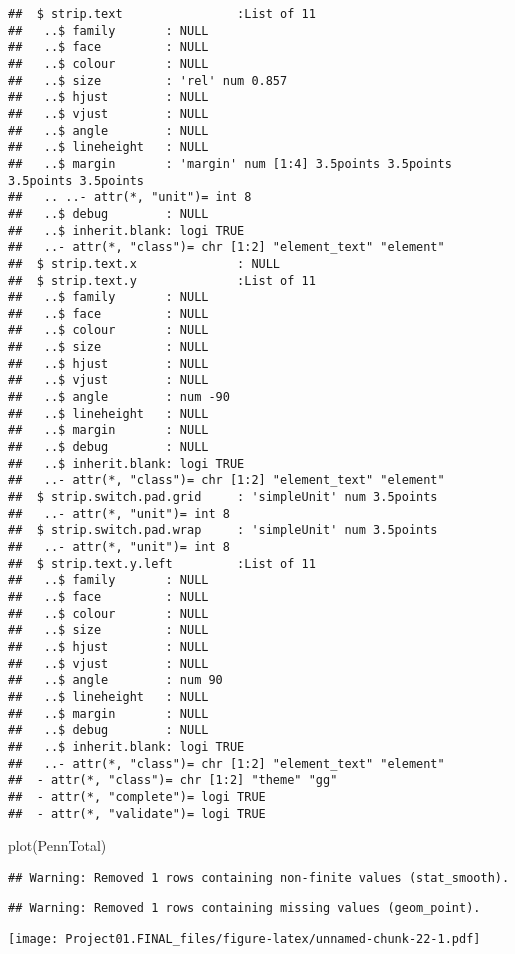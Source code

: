 \documentclass[
]{article}
\newenvironment{Shaded}{\begin{snugshade}}{\end{snugshade}}
\newcommand{\FunctionTok}[1]{\textcolor[rgb]{0.00,0.00,0.00}{#1}}
\newcommand{\NormalTok}[1]{#1}
\begin{document}
\begin{verbatim}
##  $ strip.text                :List of 11
##   ..$ family       : NULL
##   ..$ face         : NULL
##   ..$ colour       : NULL
##   ..$ size         : 'rel' num 0.857
##   ..$ hjust        : NULL
##   ..$ vjust        : NULL
##   ..$ angle        : NULL
##   ..$ lineheight   : NULL
##   ..$ margin       : 'margin' num [1:4] 3.5points 3.5points 3.5points 3.5points
##   .. ..- attr(*, "unit")= int 8
##   ..$ debug        : NULL
##   ..$ inherit.blank: logi TRUE
##   ..- attr(*, "class")= chr [1:2] "element_text" "element"
##  $ strip.text.x              : NULL
##  $ strip.text.y              :List of 11
##   ..$ family       : NULL
##   ..$ face         : NULL
##   ..$ colour       : NULL
##   ..$ size         : NULL
##   ..$ hjust        : NULL
##   ..$ vjust        : NULL
##   ..$ angle        : num -90
##   ..$ lineheight   : NULL
##   ..$ margin       : NULL
##   ..$ debug        : NULL
##   ..$ inherit.blank: logi TRUE
##   ..- attr(*, "class")= chr [1:2] "element_text" "element"
##  $ strip.switch.pad.grid     : 'simpleUnit' num 3.5points
##   ..- attr(*, "unit")= int 8
##  $ strip.switch.pad.wrap     : 'simpleUnit' num 3.5points
##   ..- attr(*, "unit")= int 8
##  $ strip.text.y.left         :List of 11
##   ..$ family       : NULL
##   ..$ face         : NULL
##   ..$ colour       : NULL
##   ..$ size         : NULL
##   ..$ hjust        : NULL
##   ..$ vjust        : NULL
##   ..$ angle        : num 90
##   ..$ lineheight   : NULL
##   ..$ margin       : NULL
##   ..$ debug        : NULL
##   ..$ inherit.blank: logi TRUE
##   ..- attr(*, "class")= chr [1:2] "element_text" "element"
##  - attr(*, "class")= chr [1:2] "theme" "gg"
##  - attr(*, "complete")= logi TRUE
##  - attr(*, "validate")= logi TRUE
\end{verbatim}

\begin{Shaded}
\begin{Highlighting}[]
\FunctionTok{plot}\NormalTok{(PennTotal)}
\end{Highlighting}
\end{Shaded}

\begin{verbatim}
## Warning: Removed 1 rows containing non-finite values (stat_smooth).
\end{verbatim}

\begin{verbatim}
## Warning: Removed 1 rows containing missing values (geom_point).
\end{verbatim}

\texttt{[image: Project01.FINAL\_files/figure-latex/unnamed-chunk-22-1.pdf]}
\end{document}
